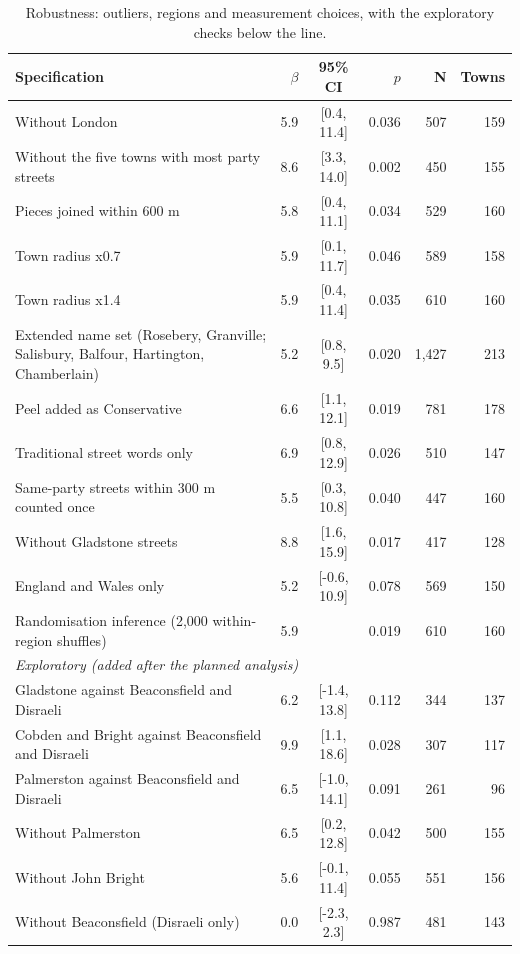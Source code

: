 \documentclass[11pt,a4paper]{article}
\begin{document}
\begin{table}[tbp]\centering\footnotesize\begin{threeparttable}\caption{Robustness: outliers, regions and measurement choices, with the exploratory checks below the line.}\label{tab:robust}\begin{tabular}{p{7.2cm}rcrrr}\toprule Specification & $\beta$ & 95\% CI & $p$ & N & Towns\\\midrule
Without London & 5.9 & [0.4, 11.4] & 0.036 & 507 & 159\\
Without the five towns with most party streets & 8.6 & [3.3, 14.0] & 0.002 & 450 & 155\\
Pieces joined within 600 m & 5.8 & [0.4, 11.1] & 0.034 & 529 & 160\\
Town radius x0.7 & 5.9 & [0.1, 11.7] & 0.046 & 589 & 158\\
Town radius x1.4 & 5.9 & [0.4, 11.4] & 0.035 & 610 & 160\\
Extended name set (Rosebery, Granville; Salisbury, Balfour, Hartington, Chamberlain) & 5.2 & [0.8, 9.5] & 0.020 & 1,427 & 213\\
Peel added as Conservative & 6.6 & [1.1, 12.1] & 0.019 & 781 & 178\\
Traditional street words only & 6.9 & [0.8, 12.9] & 0.026 & 510 & 147\\
Same-party streets within 300 m counted once & 5.5 & [0.3, 10.8] & 0.040 & 447 & 160\\
Without Gladstone streets & 8.8 & [1.6, 15.9] & 0.017 & 417 & 128\\
England and Wales only & 5.2 & [-0.6, 10.9] & 0.078 & 569 & 150\\
Randomisation inference (2,000 within-region shuffles) & 5.9 & & 0.019 & 610 & 160\\
\midrule\multicolumn{6}{l}{\textit{Exploratory (added after the planned analysis)}}\\
Gladstone against Beaconsfield and Disraeli & 6.2 & [-1.4, 13.8] & 0.112 & 344 & 137\\
Cobden and Bright against Beaconsfield and Disraeli & 9.9 & [1.1, 18.6] & 0.028 & 307 & 117\\
Palmerston against Beaconsfield and Disraeli & 6.5 & [-1.0, 14.1] & 0.091 & 261 & 96\\
Without Palmerston & 6.5 & [0.2, 12.8] & 0.042 & 500 & 155\\
Without John Bright & 5.6 & [-0.1, 11.4] & 0.055 & 551 & 156\\
Without Beaconsfield (Disraeli only) & 0.0 & [-2.3, 2.3] & 0.987 & 481 & 143\\

\end{tabular}
\end{threeparttable}
\end{table}
\end{document}
